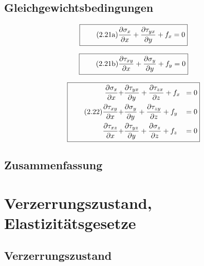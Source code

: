 \documentclass[11pt]{article}
\newcommand{\1}{ {\mathds{1}} }
\begin{document}
\begin{multicols}{2}
		\subsection{Gleichgewichtsbedingungen}

		\begin{equation}
			\boxed{
				\tag{2.21a}
				\begin{split}
					\frac{\partial\sigma_x}{\partial x}
					+
					\frac{\partial\tau_{yx}}{\partial y}
					+
					f_x
					=
					0
				\end{split}
			}
		\end{equation}

		\begin{equation}
			\boxed{
				\tag{2.21b}
				\begin{split}
					\frac{\partial\tau_{xy}}{\partial x}
					+
					\frac{\partial\sigma_{y}}{\partial y}
					+
					f_y
					=
					0
				\end{split}
			}
		\end{equation}

		\begin{equation}
			\boxed{
				\tag{2.22}
				\begin{split}
					\frac{\partial\sigma_{x}}{\partial x}
					+
					&\frac{\partial\tau_{yx}}{\partial y}
					+
					\frac{\partial\tau_{zx}}{\partial z}
					+
					f_x\!&= 0 \\
					\frac{\partial\tau_{xy}}{\partial x}
					+
					&\frac{\partial\sigma_{y}}{\partial y}
					+
					\frac{\partial\tau_{zy}}{\partial z}
					+
					f_y\!&= 0 \\
					\frac{\partial\tau_{xz}}{\partial x}
					+
					&\frac{\partial\tau_{yz}}{\partial y}
					+
					\frac{\partial\sigma_{z}}{\partial z}
					+
					f_z\!&= 0 \\
				\end{split}
			}
		\end{equation}		

		\subsection{Zusammenfassung}
		
		\section{Verzerrungszustand, Elastizitätsgesetze}
		\subsection{Verzerrungszustand}


\end{multicols}
\end{document}
